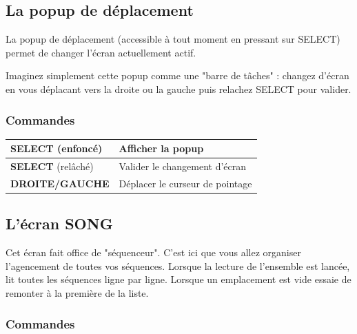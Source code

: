 \documentclass[12pt,a4paper]{article}
\begin{document}
    \subsection{La popup de déplacement}
    
    La popup de déplacement (accessible à tout moment en pressant sur SELECT) permet de changer l'écran actuellement actif. 
    
    
    Imaginez simplement cette popup comme une "barre de tâches" : changez d'écran en vous déplacant vers la droite ou la gauche puis relachez SELECT pour valider.
    
        \subsubsection{Commandes}
        
        \tablelasttail{\hline}
        \begin{supertabular}{|l|l|}
        \hline
            {\bf SELECT} (enfoncé) & Afficher la popup \\
            \hline
            {\bf SELECT} (relâché) & Valider le changement d'écran \\
            \hline
            {\bf DROITE/GAUCHE} & Déplacer le curseur de pointage \\
        \hline
        \end{supertabular}
  
    \subsection{L'écran SONG}
    
    Cet écran fait office de "séquenceur". C'est ici que vous allez organiser l'agencement de toutes vos séquences. Lorsque la lecture de l'ensemble est lancée, \FAT lit toutes les séquences ligne par ligne. Lorsque un emplacement est vide \FAT essaie de remonter à la première de la liste.
    
    
        \subsubsection{Commandes}
        
\end{document}
